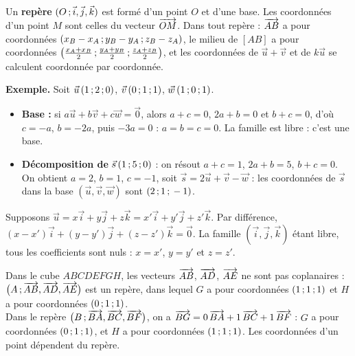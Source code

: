 \begin{propriete}
Un \textbf{repère} $(O\,{;}\,\vec i,\vec j,\vec k)$ est formé d'un point $O$ et d'une base. Les coordonnées d'un point $M$ sont celles du
vecteur $\overrightarrow{OM}$. Dans tout repère : $\overrightarrow{AB}$ a pour coordonnées $(x_B-x_A\,{;}\, y_B-y_A\,{;}\, z_B-z_A)$, le milieu de $[AB]$ a pour
coordonnées $\left(\frac{x_A+x_B}{2}\,{;}\,\frac{y_A+y_B}{2}\,{;}\,\frac{z_A+z_B}{2}\right)$, et les coordonnées de $\vec u+\vec v$ et de
$k\vec u$ se calculent coordonnée par coordonnée.
\end{propriete}

\begin{savoirfaire}
\textbf{Exemple.} Soit $\vec u\,(1\,{;}\,2\,{;}\,0)$, $\vec v\,(0\,{;}\,1\,{;}\,1)$, $\vec w\,(1\,{;}\,0\,{;}\,1)$.
\begin{itemize}[leftmargin=1.2em,itemsep=0.4mm,topsep=0.5mm]
  \item \textbf{Base :} si $a\vec u+b\vec v+c\vec w=\vec0$, alors $a+c=0$, $2a+b=0$ et $b+c=0$, d'où $c=-a$, $b=-2a$, puis
    $-3a=0$ : $a=b=c=0$. La famille est libre : c'est une base.
  \item \textbf{Décomposition de} $\vec s\,(1\,{;}\,5\,{;}\,0)$ : on résout $a+c=1$, $2a+b=5$, $b+c=0$. On obtient $a=2$, $b=1$, $c=-1$, soit
    $\vec s=2\vec u+\vec v-\vec w$ : les coordonnées de $\vec s$ dans la base $(\vec u,\vec v,\vec w)$ sont $(2\,{;}\,1\,{;}\,-1)$.
\end{itemize}
\end{savoirfaire}

\begin{demonstration}
Supposons $\vec u=x\vec i+y\vec j+z\vec k=x'\vec i+y'\vec j+z'\vec k$. Par différence,
$(x-x')\vec i+(y-y')\vec j+(z-z')\vec k=\vec0$. La famille $(\vec i,\vec j,\vec k)$ étant libre, tous les coefficients sont nuls :
$x=x'$, $y=y'$ et $z=z'$.
\end{demonstration}

\begin{exemple}
\begin{codecote}[0.62]
Dans le cube $ABCDEFGH$, les vecteurs $\overrightarrow{AB}$, $\overrightarrow{AD}$, $\overrightarrow{AE}$ ne sont pas coplanaires : $\big(A\,{;}\,\overrightarrow{AB},\overrightarrow{AD},\overrightarrow{AE}\big)$
est un repère, dans lequel $G$ a pour coordonnées $(1\,{;}\,1\,{;}\,1)$ et $H$ a pour coordonnées $(0\,{;}\,1\,{;}\,1)$.\\[1mm]
Dans le repère $\big(B\,{;}\,\overrightarrow{BA},\overrightarrow{BC},\overrightarrow{BF}\big)$, on a $\overrightarrow{BG}=0\,\overrightarrow{BA}+1\,\overrightarrow{BC}+1\,\overrightarrow{BF}$ :
$G$ a pour coordonnées $(0\,{;}\,1\,{;}\,1)$, et $H$ a pour coordonnées $(1\,{;}\,1\,{;}\,1)$. Les coordonnées d'un point dépendent du repère.
\cote
\centering
{}
\end{codecote}
\end{exemple}

